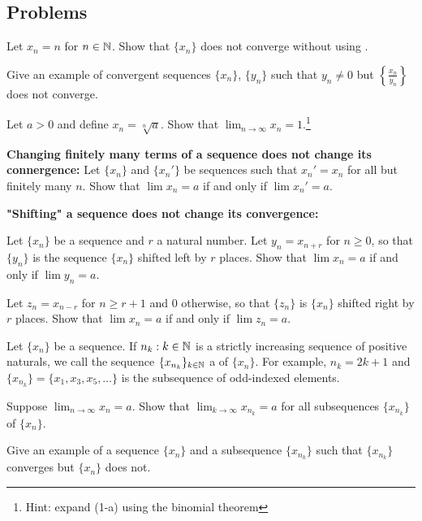 \documentclass[../notes.tex]{subfiles}
\begin{document}
\subsection{Problems}
\begin{homework}
    Let $x_n=n$ for $n\in \mathbb N$. Show that $\{x_n\}$ does not converge without using . 
\end{homework}
\begin{homework}
    Give an example of convergent sequences $\{x_n\}$, $\{y_n\}$ such that $y_n\neq 0$ but $\left\{ \frac{x_n}{y_n} \right\}$ does not converge.
\end{homework}
\begin{homework}
    Let $a>0$ and define $x_n=\sqrt[n]{a}$. Show that $\lim_{n\to \infty}x_n = 1$.\footnote{Hint: expand (1-a) using the binomial theorem} 
\end{homework}
\begin{homework}
\textbf{Changing finitely many terms of a sequence does not change its connergence: }Let $\{x_n\}$ and $\{x_n'\}$ be sequences such that $x_n' = x_n$ for all but finitely many $n$. Show that $\lim x_n = a$ if and only if $\lim x_n'=a$.
\end{homework}
\begin{homework} \textbf{"Shifting" a sequence does not change its convergence: }
\begin{listalph}
    \item Let $\{x_n\}$ be a sequence and $r$ a natural number. Let $y_n = x_{n+r}$ for $n\geq 0$, so that $\{y_n\}$ is the sequence $\{x_n\}$ shifted left by $r$ places. Show that $\lim x_n=a$ if and only if $\lim y_n=a$.
    \item  Let $z_n=x_{n-r}$ for $n\geq r+1$ and $0$ otherwise, so that $\{z_n\}$ is $\{x_n\}$ shifted right by $r$ places. Show that $\lim x_n=a$ if and only if $\lim z_n=a$.
\end{listalph}
\end{homework}
\begin{homework}
    Let $\{x_n\}$ be a sequence. If $n_k : k\in \mathbb N$ is a strictly increasing sequence of positive naturals, we call the sequence $\{x_{n_k}\}_{k\in \mathbb N}$ a  of $\{x_n\}$. For example, $n_k = 2k+1$ and $\{x_{n_k}\}=\{x_1, x_3, x_5, \dots\}$ is the subsequence of odd-indexed elements. 
    \begin{listalph}
        \item Suppose $\lim_{n\to \infty} x_n =a$. Show that $\lim_{k\to\infty}x_{n_k}=a$ for all subsequences $\{x_{n_k}\}$ of $\{x_n\}$. 
        \item Give an example of a sequence $\{x_n\}$ and a subsequence $\{x_{n_k}\}$ such that $\{x_{n_k}\}$ converges but $\{x_n\}$ does not. 
    \end{listalph}
\end{homework}
\end{document}
